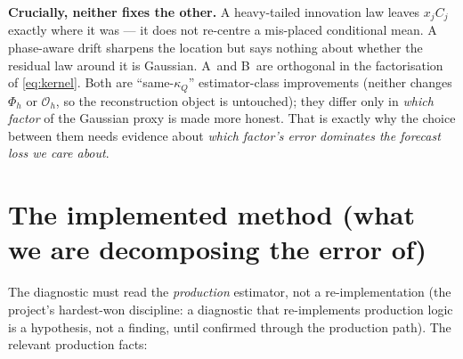 \documentclass[11pt]{article}
\newcommand{\kQ}{\kappa_{Q}}
\newcommand{\defA}{\textsf{A}}
\newcommand{\defB}{\textsf{B}}
\begin{document}
\noindent\textbf{Crucially, neither fixes the other.} A heavy-tailed
innovation law leaves $x_j C_j$ exactly where it was --- it does not
re-centre a mis-placed conditional mean. A phase-aware drift sharpens the
location but says nothing about whether the residual law around it is
Gaussian. \defA\ and \defB\ are orthogonal in the factorisation of
\eqref{eq:kernel}. Both are ``same-$\kQ$'' estimator-class improvements
(neither changes $\Phi_h$ or $\mathcal{O}_h$, so the reconstruction
object is untouched); they differ only in \emph{which factor} of the
Gaussian proxy is made more honest. That is exactly why the choice
between them needs evidence about \emph{which factor's error dominates
the forecast loss we care about}.

\section{The implemented method (what we are decomposing the error of)}
\label{sec:method}

The diagnostic must read the \emph{production} estimator, not a
re-implementation (the project's hardest-won discipline: a diagnostic
that re-implements production logic is a hypothesis, not a finding, until
confirmed through the production path). The relevant production facts:
\end{document}
